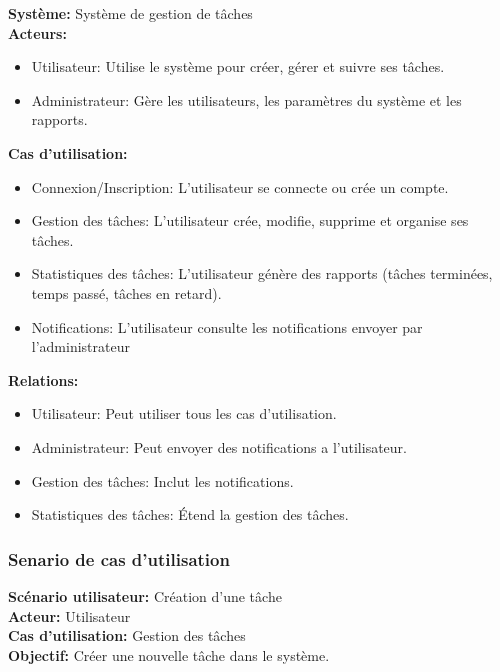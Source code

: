 \documentclass[a4paper,12pt]{report}
\begin{document}
\textbf{Système:} Système de gestion de tâches\\
\textbf{Acteurs:}
\begin{itemize}
    \item Utilisateur: Utilise le système pour créer, gérer et suivre ses tâches.
    \item Administrateur: Gère les utilisateurs, les paramètres du système et les rapports.
\end{itemize}
\textbf{Cas d'utilisation:}
\begin{itemize}
    \item Connexion/Inscription: L'utilisateur se connecte ou crée un compte.
    \item Gestion des tâches:
        L'utilisateur crée, modifie, supprime et organise ses tâches.
    \item Statistiques des tâches: L'utilisateur génère des rapports (tâches terminées, temps passé, tâches en retard).
    \item Notifications: L'utilisateur consulte les notifications envoyer par l'administrateur
\end{itemize}
\textbf{Relations:}
\begin{itemize}
    \item Utilisateur: Peut utiliser tous les cas d'utilisation.
    \item Administrateur: Peut envoyer des notifications a l'utilisateur.
    \item Gestion des tâches: Inclut les notifications.
    \item Statistiques des tâches: Étend la gestion des tâches.
\end{itemize}

\subsubsection{Senario de cas d'utilisation}

\textbf{Scénario utilisateur:} Création d'une tâche\\
\textbf{Acteur:} Utilisateur\\
\textbf{Cas d'utilisation:} Gestion des tâches\\
\textbf{Objectif:} Créer une nouvelle tâche dans le système.\\
\end{document}
